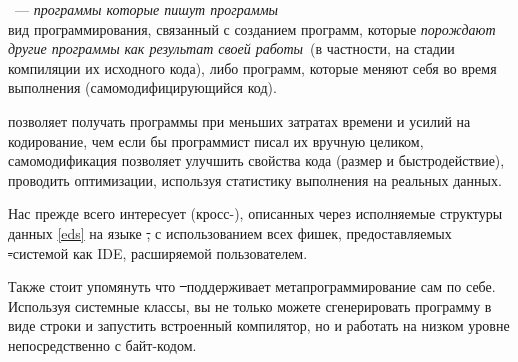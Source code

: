 \label{meta}\secdown

\ --- \textit{программы которые пишут программы}\\
вид программирования, связанный с созданием программ, 
которые \emph{порождают другие программы как результат своей работы}\ (в частности, на стадии компиляции их исходного кода), 
либо программ, которые меняют себя во время выполнения (самомодифицирующийся код).

\clearpage
{} позволяет получать программы при меньших затратах времени и 
усилий на кодирование, чем если бы программист писал их вручную целиком, 
самомодификация позволяет улучшить свойства кода (размер и быстродействие),
проводить оптимизации, используя статистику выполнения на реальных данных.

Нас прежде всего интересует (кросс-), описанных через исполняемые структуры данных \ref{eds}
на языке \st, с использованием всех фишек, предоставляемых \st-системой как IDE,
расширяемой пользователем.

Также стоит упомянуть что \st\ поддерживает метапрограммирование сам по себе. Используя системные классы,
вы не только можете сгенерировать программу в виде строки и запустить встроенный компилятор, но и 
работать на низком уровне непосредственно с байт-кодом.

% 











\secup
